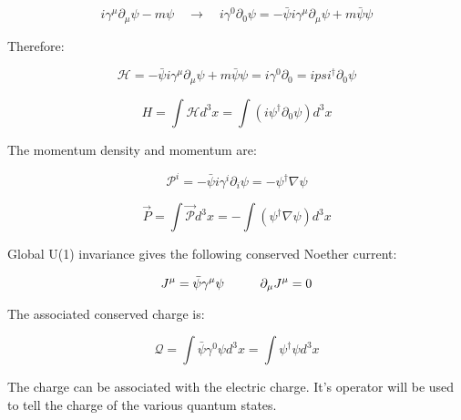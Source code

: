 \documentclass[a4]{article}
\begin{document}
    \begin{equation}
        i \gamma^{\mu} \partial_{\mu} \psi - m \psi \quad \rightarrow \quad i \gamma^{0} \partial_{0} \psi = - \bar{\psi} i \gamma^{\mu} \partial_{\mu} \psi + m \bar{\psi} \psi
    \end{equation}

    Therefore:

    \begin{equation}
      \mathcal{H} = - \bar{\psi} i \gamma^{\mu} \partial_{\mu} \psi + m \bar{\psi} \psi = i \gamma^{0} \partial_{0} = i psi^{\dagger} \partial_{0} \psi
    \end{equation}

    \begin{equation}
      H = \int \mathcal{H} d^{3} x = \int (i \psi^{\dagger} \partial_{0} \psi) d^{3} x
    \end{equation}

    The momentum density and momentum are:

    \begin{equation}
        \mathcal{P}^{i} = - \bar{\psi} i \gamma^{i} \partial_{i} \psi = - \psi^{\dagger} \nabla \psi
    \end{equation}

    \begin{equation}
        \vec{P} = \int \vec{\mathcal{P}} d^{3} x = - \int (\psi^{\dagger} \nabla \psi) d^{3} x
    \end{equation}

    Global U(1) invariance gives the following conserved Noether current:

    \begin{equation}
        J^{\mu} = \bar{\psi} \gamma^{\mu} \psi \hspace*{1.0cm} \partial_{\mu} J^{\mu} = 0 
    \end{equation}

    The associated conserved charge is:

    \begin{equation}
        \mathcal{Q} = \int \bar{\psi} \gamma^{0} \psi d^{3} x = \int \psi^{\dagger} \psi d^{3} x
    \end{equation}

    The charge can be associated with the electric charge. It's operator will be used to tell the charge of
    the various quantum states.
\end{document}
